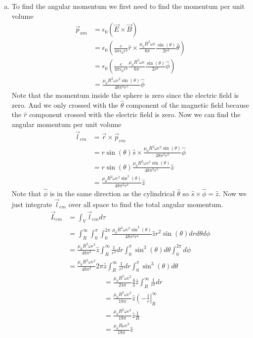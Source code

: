 \documentclass[11pt]{article}
\numberwithin{equation}{section}
\begin{document}
\begin{enumerate}[(a)]
\item
To find the angular momentum we first need to find the momentum per unit volume
\begin{align*}
\vec{p}_{um} &= \epsilon_0(\vec{E}\times\vec{B})\\
&= \epsilon_0\left(\frac{e}{4\pi\epsilon_0 r^2}\hat{r}\times\frac{\mu_0R^2\omega e}{6\pi}\frac{\sin(\theta)}{2r^3}\hat{\theta}\right)\\
&= \epsilon_0\left(\frac{e}{4\pi\epsilon_0 r^2}\frac{\mu_0R^2\omega e}{6\pi}\frac{\sin(\theta)}{2r^3}\hat{\phi}\right)\\
&= \frac{\mu_0R^2\omega e^2\sin(\theta)}{48\pi^2r^5}\hat{\phi}
\end{align*}
Note that the momentum inside the sphere is zero since the electric field is zero. And we only crossed with the $\hat{\theta}$ component of the magnetic field because the $\hat{r}$ component crossed with the electric field is zero. Now we can find the angular momentum per unit volume 
\begin{align*}
\vec{l}_{em} &= \vec{r}\times\vec{p}_{em}\\
&= r\sin(\theta)\hat{s}\times\frac{\mu_0R^2\omega e^2\sin(\theta)}{48\pi^2r^5}\hat{\phi}\\
&= r\sin(\theta)\frac{\mu_0R^2\omega e^2\sin(\theta)}{48\pi^2r^5}\hat{z}\\
&= \frac{\mu_0R^2\omega e^2\sin^2(\theta)}{48\pi^2r^4}\hat{z}
\end{align*}
Note that $\hat{\phi}$ is in the same direction as the cylindrical $\hat{\theta}$ so $\hat{s}\times\hat{\phi}=\hat{z}$. Now we just integrate $\vec{l}_{em}$ over all space to find the total angular momentum.
\begin{align*}
\vec{L}_{em} &= \int_{V}\vec{l}_{em}d\tau\\
&= \int_R^{\infty}\int_0^{\pi}\int_0^{2\pi}\frac{\mu_0R^2\omega e^2\sin^2(\theta)}{48\pi^2r^4}\hat{z}r^2\sin(\theta)drd\theta d\phi\\
&= \frac{\mu_0R^2\omega e^2}{48\pi^2}\hat{z}\int_R^{\infty}\frac{1}{r^2}dr\int_0^{\pi}\sin^3(\theta)d\theta\int_0^{2\pi}d\phi\\
&= \frac{\mu_0R^2\omega e^2}{48\pi^2}2\pi\hat{z}\int_R^{\infty}\frac{1}{r^2}dr\int_0^{\pi}\sin^3(\theta)d\theta
\end{align*}
\begin{align*}
&= \frac{\mu_0R^2\omega e^2}{24\pi}\frac{4}{3}\hat{z}\int_R^{\infty}\frac{1}{r^2}dr\\
&= \frac{\mu_0R^2\omega e^2}{18\pi}\hat{z}\left(-\frac{1}{r}\right|_R^{\infty}\\
&= \frac{\mu_0R^2\omega e^2}{18\pi}\hat{z}\frac{1}{R}\\
&= \frac{\mu_0R\omega e^2}{18\pi}\hat{z}
\end{align*}


\end{enumerate}
\end{document}
